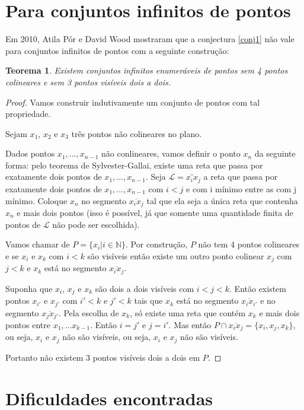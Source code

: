 \documentclass[a4paper]{book}
\newtheorem{teorema}{Teorema}
\begin{document}
\section{Para conjuntos infinitos de pontos}
Em 2010\cite{infinity}, Atila Pór e David Wood mostraram que a conjectura \ref{conj1} não vale para conjuntos infinitos de pontos com a seguinte construção:

\begin{teorema}
    Existem conjuntos infinitos enumeráveis de pontos sem 4 pontos colineares e sem 3 pontos visíveis dois a dois.
\end{teorema}
\begin{proof}
    Vamos construir indutivamente um conjunto de pontos com tal propriedade.

    Sejam $x_1$, $x_2$ e $x_3$ três pontos não colineares no plano.

    Dados pontos $x_1,...,x_{n-1}$ não conlineares, vamos definir o ponto $x_n$ da seguinte forma: pelo teorema de Sylvester-Gallai, existe uma reta que passa por exatamente dois pontos de $x_1,...,x_{n-1}$. Seja $\mathcal L=\overleftrightarrow{x_ix_j}$ a reta que passa por exatamente dois pontos de $x_1,...,x_{n-1}$ com $i<j$ e com i mínimo entre as com j mínimo. Coloque $x_n$ no segmento $\overline{x_ix_j}$ tal que ela seja a única reta que contenha $x_n$ e mais dois pontos (isso é possível, já que somente uma quantidade finita de pontos de $\mathcal L$ não pode ser escolhida).

    Vamos chamar de $P = \{x_i|i\in \mathbb N\}$. Por construção, $P$ não tem 4 pontos colineares e se $x_i$ e $x_k$ com $i<k$ são visíveis então existe um outro ponto colinear $x_j$ com $j<k$ e $x_k$ está no segmento $\overline{x_ix_j}$.

    Suponha que $x_i$, $x_j$ e $x_k$ são dois a dois visíveis com $i<j<k$. Então existem pontos $x_{i'}$ e $x_{j'}$ com $i'<k$ e $j'<k$ tais que $x_k$ está no segmento $\overline{x_ix_{i'}}$ e no segmento $\overline{x_jx_{j'}}$. Pela escolha de $x_k$, só existe uma reta que contém $x_k$ e mais dois pontos entre $x_1,...x_{k-1}$. Então $i=j'$ e $j=i'$. Mas então $P\cap\overline{x_ix_j}=\{x_i,x_j,x_k\}$, ou seja, $x_i$ e $x_j$ não são visíveis, ou seja, $x_i$ e $x_j$ não são visíveis.

    Portanto não existem 3 pontos visíveis dois a dois em $P$.

\end{proof}

\section{Dificuldades encontradas}
\end{document}
